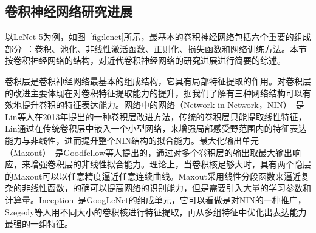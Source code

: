 

\subsection{卷积神经网络研究进展}


以LeNet-5为例，如图~\ref{fig:lenet}所示，最基本的卷积神经网络包括六个重要的组成部分~\cite{gu2015recent,bengio2013representation,bengio2009learning,lecun2010convolutional,schmidhuber2015deep,Goodfellow-et-al-2016-Book}：卷积、池化、非线性激活函数、正则化、损失函数和网络训练方法。本节按卷积神经网络的结构，对近代卷积神经网络的研究进展进行简要的综述。

卷积层是卷积神经网络最基本的组成结构，它具有局部特征提取的作用。对卷积层的改进主要体现在对卷积特征提取能力的提升，据我们了解有三种网络结构可以有效地提升卷积的特征表达能力。网络中的网络（Network in Network，NIN）~\cite{DBLP:journals/corr/LinCY13}是Lin等人在2013年提出的一种卷积层改进方法，传统的卷积层只能提取线性特征，Lin通过在传统卷积层中嵌入一个小型网络，来增强局部感受野范围内的特征表达能力与非线性，进而提升整个NIN结构的拟合能力。最大化输出单元（Maxout）~\cite{goodfellow2013maxout}是Goodfellow等人提出的，通过对多个卷积层的输出取最大输出响应，来增强卷积层的非线性拟合能力。理论上，当卷积核足够大时，具有两个隐层的Maxout可以以任意精度逼近任意连续曲线。Maxout采用线性分段函数来逼近复杂的非线性函数，的确可以提高网络的识别能力，但是需要引入大量的学习参数和计算量。Inception~\cite{szegedy2014going,szegedy2015rethinking,szegedy2016inception}是GoogLeNet的组成单元，它可以看做是对NIN的一种推广，Szegedy等人用不同大小的卷积核进行特征提取，再从多组特征中优化出表达能力最强的一组特征。

